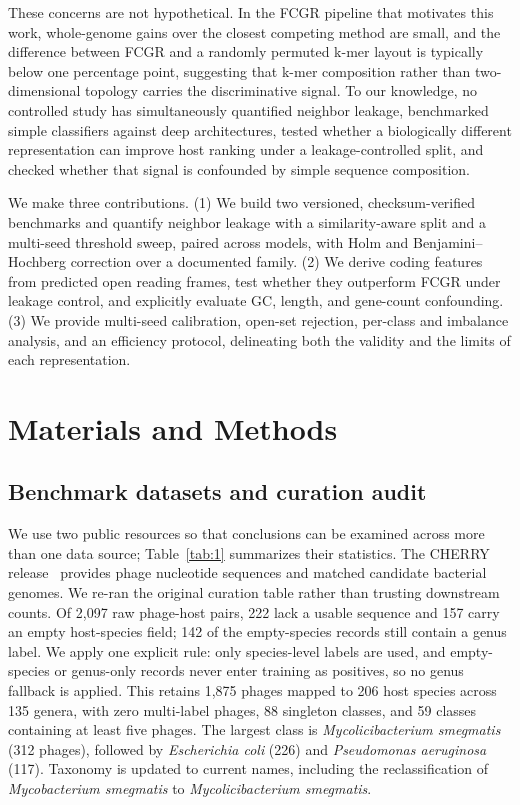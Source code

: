 \documentclass[utf8]{FrontiersinVancouver}
\begin{document}
These concerns are not hypothetical. In the FCGR pipeline that motivates this work, whole-genome gains over the closest competing method are small, and the difference between FCGR and a randomly permuted k-mer layout is typically below one percentage point, suggesting that k-mer composition rather than two-dimensional topology carries the discriminative signal. To our knowledge, no controlled study has simultaneously quantified neighbor leakage, benchmarked simple classifiers against deep architectures, tested whether a biologically different representation can improve host ranking under a leakage-controlled split, and checked whether that signal is confounded by simple sequence composition.

We make three contributions. (1) We build two versioned, checksum-verified benchmarks and quantify neighbor leakage with a similarity-aware split and a multi-seed threshold sweep, paired across models, with Holm and Benjamini--Hochberg correction over a documented family. (2) We derive coding features from predicted open reading frames, test whether they outperform FCGR under leakage control, and explicitly evaluate GC, length, and gene-count confounding. (3) We provide multi-seed calibration, open-set rejection, per-class and imbalance analysis, and an efficiency protocol, delineating both the validity and the limits of each representation.

\section{Materials and Methods}

\subsection{Benchmark datasets and curation audit}

We use two public resources so that conclusions can be examined across more than one data source; Table~\ref{tab:1} summarizes their statistics. The CHERRY release~\citep{shang2022cherry} provides phage nucleotide sequences and matched candidate bacterial genomes. We re-ran the original curation table rather than trusting downstream counts. Of 2,097 raw phage-host pairs, 222 lack a usable sequence and 157 carry an empty host-species field; 142 of the empty-species records still contain a genus label. We apply one explicit rule: only species-level labels are used, and empty-species or genus-only records never enter training as positives, so no genus fallback is applied. This retains 1,875 phages mapped to 206 host species across 135 genera, with zero multi-label phages, 88 singleton classes, and 59 classes containing at least five phages. The largest class is \textit{Mycolicibacterium smegmatis} (312 phages), followed by \textit{Escherichia coli} (226) and \textit{Pseudomonas aeruginosa} (117). Taxonomy is updated to current names, including the reclassification of \textit{Mycobacterium smegmatis} to \textit{Mycolicibacterium smegmatis}.
\end{document}
